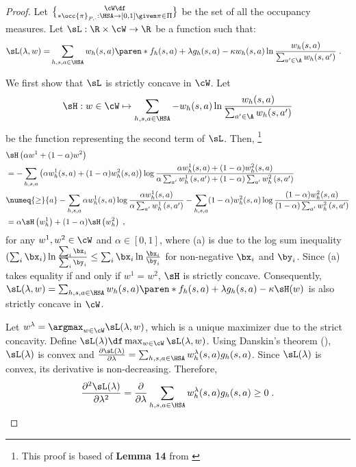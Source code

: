 \begin{proof}
Let $\cW \df \brace*{\occ{\pi}_{P, \cdot}: \HSA \to [0, 1] \given \pi \in \Pi}$ be the set of all the occupancy measures.
Let $\sL: \R\times \cW \to \R$ be a function such that:
\begin{align*}
\sL(\lambda, w) = &\sum_{h, s, a \in \HSA} w_h(s, a)\paren*{f_h(s, a) + \lambda g_h(s, a)}
- \kappa w_h(s, a)\ln \frac{w_h(s, a)}{\sum_{a' \in \A}w_h(s, a')}\;.
\end{align*}

We first show that $\sL$ is strictly concave in $\cW$.
Let 
$$\sH: w \in \cW \mapsto \sum_{h, s, a \in \HSA} - w_h(s, a)\ln \frac{w_h(s, a)}{\sum_{a' \in \A}w_h(s, a')}$$ 
be the function representing the second term of $\sL$.
Then, \footnote{This proof is based of \textbf{Lemma 14} from \citet{ding2023last}}
\begin{align*}
& \sH\left(\alpha w^1+(1-\alpha) w^2\right) \\
& =-\sum_{h, s, a}\left(\alpha w_h^1(s, a)+(1-\alpha) w_h^2(s, a)\right) \log \frac{\alpha w_h^1(s, a)+(1-\alpha) w_h^2(s, a)}{\alpha \sum_{a^{\prime}} w_h^1\left(s, a^{\prime}\right)+(1-\alpha) \sum_{a^{\prime}} w_h^2\left(s, a^{\prime}\right)} \\
& \numeq{\geq}{a}-\sum_{h, s, a} \alpha w_h^1(s, a) \log \frac{\alpha w_h^1(s, a)}{\alpha \sum_{a^{\prime}} w_h^1\left(s, a^{\prime}\right)}-\sum_{h, s, a}(1-\alpha) w_h^2(s, a) \log \frac{(1-\alpha) w_h^2(s, a)}{(1-\alpha) \sum_{a^{\prime}} w_h^2\left(s, a^{\prime}\right)} \\
& =\alpha \sH\left(w_h^1\right)+(1-\alpha) \sH\left(w_h^2\right)\;,
\end{align*}
for any $w^1, w^2 \in \cW$ and $\alpha \in [0, 1]$, where (a) is due to the log sum inequality 
$\left(\sum_i \bx_i\right) \ln \frac{\sum_i \bx_i}{\sum_i \by_i} \leq \sum_i \bx_i \ln \frac{\bx_i}{\by_i}$
for non-negative $\bx_i$ and $\by_i$.
Since (a) takes equality if and only if $w^1 = w^2$, $\sH$ is strictly concave.
Consequently, 
\(
\sL(\lambda, w) = \sum_{h, s, a \in \HSA} w_h(s, a)\paren*{f_h(s, a) + \lambda g_h(s, a)}
- \kappa \sH(w)
\) is also strictly concave in $\cW$.

Let \(w^\lambda = \argmax_{w \in \cW} \sL(\lambda, w)\), which is a unique maximizer due to the strict concavity. 
Define $\sL(\lambda) \df \max_{w \in \cW} \sL(\lambda, w)$. 
Using Danskin's theorem (), 
$\sL(\lambda)$ is convex and $\frac{\partial\sL (\lambda)}{\partial \lambda} = \sum_{h, s, a \in \HSA} w^\lambda_h(s, a)g_h(s, a)$.
Since $\sL(\lambda)$ is convex, its derivative is non-decreasing. Therefore,
\begin{align}\label{eq:L-lambda-increasing}
\frac{\partial^2\sL (\lambda)}{\partial \lambda^2} =   
\frac{\partial}{\partial \lambda}
\sum_{h, s, a \in \HSA} w^\lambda_h(s, a)g_h(s, a) \geq 0\;.
\end{align}


\end{proof}
